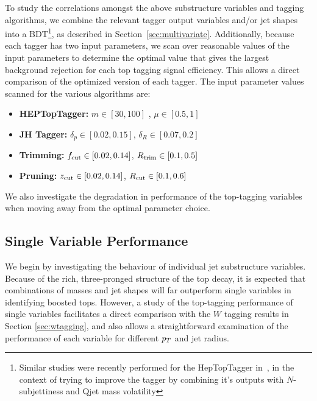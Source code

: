 To study the correlations amongst the above substructure variables and tagging algorithms,
we combine the relevant tagger output variables and/or jet shapes into a BDT\footnote{Similar studies were recently performed for the HepTopTagger in~\cite{Kasieczka:2015jma}, in the context of trying to improve the tagger by combining it's outputs with $N$-subjettiness and Qjet mass volatility}, as described in Section~\ref{sec:multivariate}. 
Additionally, because each tagger has two input parameters, we scan over reasonable values of the input parameters to determine the optimal value that gives the largest background rejection for each top tagging signal efficiency. This allows a direct comparison of the optimized version of each tagger. The input parameter values scanned for the various algorithms are:
%
\begin{itemize}
\item {\bf HEPTopTagger:} $m\in[30,100]$ \GeV, $\mu\in[0.5,1]$
\item {\bf JH Tagger:} $\delta_p\in[0.02,0.15]$, $\delta_R\in[0.07,0.2]$
\item {\bf Trimming:} $f_{\rm cut}\in[0.02,0.14]$, $R_{\rm trim}\in[0.1,0.5]$
\item {\bf Pruning:} $z_{\rm cut}\in[0.02,0.14]$, $R_{\rm cut}\in[0.1,0.6]$
\end{itemize}
%
We also investigate the degradation in performance of the top-tagging variables when moving away from the optimal parameter choice.

\subsection{Single Variable Performance}\label{sec:single_variable}
We begin by investigating the behaviour of individual jet substructure variables. Because of the rich, three-pronged structure of the top decay, it is expected that combinations of masses and jet shapes will far outperform single variables in identifying boosted tops. However, a study of the top-tagging performance of single variables facilitates a direct comparison with the $W$ tagging results in Section \ref{sec:wtagging}, and also allows a straightforward examination of the performance of each variable for different $p_T$ and jet radius.

